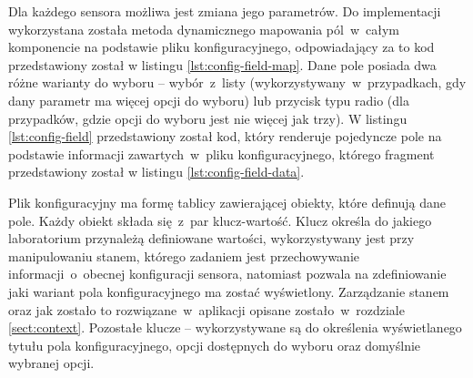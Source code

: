 Dla każdego sensora możliwa jest zmiana jego parametrów. Do implementacji wykorzystana została
metoda dynamicznego mapowania pól~w~całym komponencie na podstawie pliku konfiguracyjnego,
odpowiadający za to kod przedstawiony został w listingu \ref{lst:config-field-map}. Dane pole
posiada dwa różne warianty do wyboru -- wybór~z~listy (wykorzystywany~w~przypadkach, gdy dany
parametr ma więcej opcji do wyboru) lub przycisk typu radio (dla przypadków, gdzie opcji do wyboru
jest nie więcej jak trzy). W listingu \ref{lst:config-field} przedstawiony został kod, który
renderuje pojedyncze pole na podstawie informacji zawartych~w~pliku konfiguracyjnego, którego
fragment przedstawiony został w listingu \ref{lst:config-field-data}.




Plik konfiguracyjny ma formę tablicy zawierającej obiekty, które definują dane pole. Każdy obiekt
składa się~z~par klucz-wartość. Klucz  określa do jakiego laboratorium przynależą
definiowane wartości,  wykorzystywany jest przy manipulowaniu stanem, którego zadaniem
jest przechowywanie informacji~o~obecnej konfiguracji sensora, natomiast  pozwala na
zdefiniowanie jaki wariant pola konfiguracyjnego ma zostać wyświetlony. Zarządzanie stanem oraz jak
zostało to rozwiązane~w~aplikacji opisane zostało~w~rozdziale \ref{sect:context}. Pozostałe klucze
--  wykorzystywane są do określenia
wyświetlanego tytułu pola konfiguracyjnego, opcji dostępnych do wyboru oraz domyślnie
wybranej opcji.